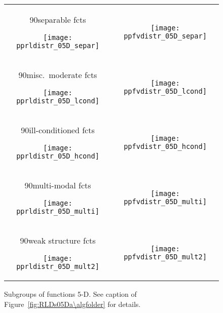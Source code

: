 \documentclass{article}
\newcommand{\Df}{\ensuremath{\Delta f}}
\newcommand{\fopt}{\ensuremath{f_\mathrm{opt}}}
\newcommand{\rot}[2][2.5]{
  \hspace*{-3.5\baselineskip}%
  \begin{rotate}{90}\hspace{#1em}#2
  \end{rotate}}
\begin{document}
\begin{figure}[htbp!]
\centering
\begin{tabular}{@{}c@{}c@{}}
\rot[2.5]{separable fcts}
\texttt{[image: pprldistr\_05D\_separ]} &
\texttt{[image: ppfvdistr\_05D\_separ]}
\\[-1ex]
\rot[1.3]{misc.\ moderate fcts}
\texttt{[image: pprldistr\_05D\_lcond]} &
\texttt{[image: ppfvdistr\_05D\_lcond]}
\\[-1ex]
\rot[1.1]{ill-conditioned fcts}
\texttt{[image: pprldistr\_05D\_hcond]} &
\texttt{[image: ppfvdistr\_05D\_hcond]}
\\[-1ex]
\rot[1.7]{multi-modal fcts}
\texttt{[image: pprldistr\_05D\_multi]} &
\texttt{[image: ppfvdistr\_05D\_multi]}
\\[-1ex]
\rot[1.5]{weak structure fcts}
\texttt{[image: pprldistr\_05D\_mult2]} &
\texttt{[image: ppfvdistr\_05D\_mult2]}
\end{tabular}
\vspace*{-0.5ex}
\caption{\label{fig:RLDs05Db\algfolder}Subgroups of functions 5-D. See caption of Figure~\ref{fig:RLDs05Da\algfolder} for details.
}
\end{figure}
\end{document}
